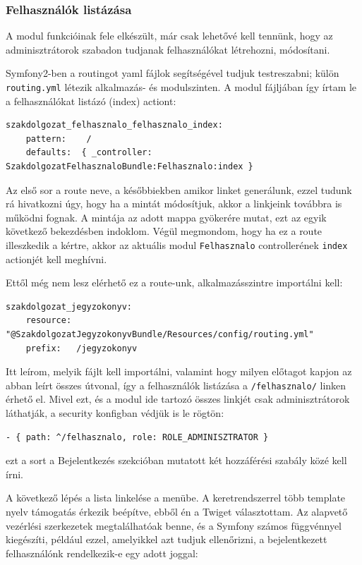 \documentclass[a4paper,12pt,oneside]{report}
\begin{document}
\subsubsection*{Felhasználók listázása}

A modul funkcióinak fele elkészült, már csak lehetővé kell tennünk, hogy az adminisztrátorok szabadon tudjanak felhasználókat létrehozni, módosítani.

Symfony2-ben a routingot yaml fájlok segítségével tudjuk testreszabni; külön {\tt routing.yml} létezik alkalmazás- és modulszinten. A modul fájljában így írtam le a felhasználókat listázó (index) actiont:

\begin{lstlisting}
szakdolgozat_felhasznalo_felhasznalo_index:
    pattern:    /
    defaults:  { _controller: SzakdolgozatFelhasznaloBundle:Felhasznalo:index }
\end{lstlisting}

Az első sor a route neve, a későbbiekben amikor linket generálunk, ezzel tudunk rá hivatkozni úgy, hogy ha a mintát módosítjuk, akkor a linkjeink továbbra is működni fognak. A mintája az adott mappa gyökerére mutat, ezt az egyik következő bekezdésben indoklom. Végül megmondom, hogy ha ez a route illeszkedik a kértre, akkor az aktuális modul {\tt Felhasznalo} controllerének {\tt index} actionjét kell meghívni.

Ettől még nem lesz elérhető ez a route-unk, alkalmazásszintre importálni kell:

\begin{lstlisting}
szakdolgozat_jegyzokonyv:
    resource: "@SzakdolgozatJegyzokonyvBundle/Resources/config/routing.yml"
    prefix:   /jegyzokonyv
\end{lstlisting}

Itt leírom, melyik fájlt kell importálni, valamint hogy milyen előtagot kapjon az abban leírt összes útvonal, így a felhasználók listázása a {\tt /felhasznalo/} linken érhető el. Mivel ezt, és a modul ide tartozó összes linkjét csak adminisztrátorok láthatják, a security konfigban védjük is le rögtön:

\begin{lstlisting}
- { path: ^/felhasznalo, role: ROLE_ADMINISZTRATOR }
\end{lstlisting}

ezt a sort a Bejelentkezés szekcióban mutatott két hozzáférési szabály közé kell írni.

A következő lépés a lista linkelése a menübe. A keretrendszerrel több template nyelv támogatás érkezik beépítve, ebből én a Twiget\cite{website:twig} választottam. Az alapvető vezérlési szerkezetek megtalálhatóak benne, és a Symfony számos függvénnyel kiegészíti, például ezzel, amelyikkel azt tudjuk ellenőrizni, a bejelentkezett felhasználónk rendelkezik-e egy adott joggal:
\end{document}
